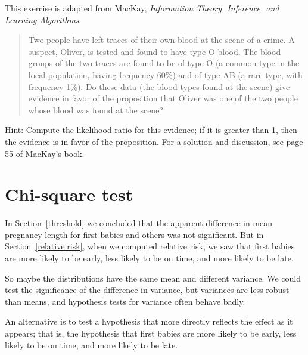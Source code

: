\documentclass[12pt]{book}
\begin{document}
\begin{exercise}
This exercise is adapted from MacKay, {\em Information
  Theory, Inference, and Learning Algorithms}:


\begin{quote}

Two people have left traces of their own blood at the scene of a
crime.  A suspect, Oliver, is tested and found to have type O blood.
The blood groups of the two traces are found to be of type O (a common
type in the local population, having frequency 60\%) and of type AB (a
rare type, with frequency 1\%).  Do these data (the blood types found
at the scene) give evidence in favor of the proposition that
Oliver was one of the two people whose blood was found at the scene?

\end{quote}

Hint: Compute the likelihood ratio for this evidence; if it is greater
than 1, then the evidence is in favor of the proposition.
For a solution and discussion, see page 55 of MacKay's book.


\end{exercise}


\section{Chi-square test}

In Section~\ref{threshold} we concluded that the apparent difference
in mean pregnancy length for first babies and others was not
significant.  But in Section~\ref{relative.risk}, when we computed
relative risk, we saw that first babies are more likely to be early,
less likely to be on time, and more likely to be late.



So maybe the distributions have the same mean and different variance.
We could test the significance of the difference in variance, but
variances are less robust than means, and hypothesis tests for
variance often behave badly.


An alternative is to test a hypothesis that more directly reflects the
effect as it appears; that is, the hypothesis that first babies are
more likely to be early, less likely to be on time, and more likely to
be late.
\end{document}
